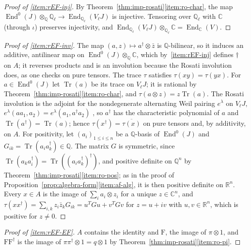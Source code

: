 \documentclass[11pt]{amsart}
\theoremstyle{plain}
\theoremstyle{definition}
\theoremstyle{remark}
\numberwithin{equation}{section}
\newcommand{\C}{\mathbb{C}}
\newcommand{\R}{\mathbb{R}}
\newcommand{\Q}{\mathbb{Q}}
\DeclareMathOperator{\Tr}{Tr}
\begin{document}
\begin{proof}[Proof of \ref{item:rEF-inj}]
By Theorem~\ref{thm:imp-rosati}\ref{item:ro-char}, the map
$\operatorname{End}^0(J)\otimes_\Q\Q_\ell\to\operatorname{End}_{\Q_\ell}
(V_\ell J)$ is injective. Tensoring over $\Q_\ell$ with $\C$ (through
$\iota$) preserves injectivity, and
$\operatorname{End}_{\Q_\ell}(V_\ell J)\otimes_{\Q_\ell}\C=
\operatorname{End}_\C(V)$.
\end{proof}

\begin{proof}[Proof of \ref{item:rEF-inv}]
The map $(a,z)\mapsto a^\dagger\otimes\bar z$ is $\Q$-bilinear, so it
induces an additive, antilinear map on
$\operatorname{End}^0(J)\otimes_\Q\C$, which by~\ref{item:rEF-inj}
defines $\dagger$ on $A$; it reverses products and is an involution
because the Rosati involution does, as one checks on pure tensors. The
trace $\tau$ satisfies $\tau(xy)=\tau(yx)$. For
$a\in\operatorname{End}^0(J)$ let $\Tr(a)$ be its trace on $V_\ell J$;
it is rational by Theorem~\ref{thm:imp-rosati}\ref{item:ro-char}, and
$\tau(a\otimes z)=z\Tr(a)$. The Rosati involution is the adjoint for
the nondegenerate alternating Weil pairing $e^\lambda$ on $V_\ell J$,
$e^\lambda(aa_1,a_2)=e^\lambda(a_1,a^\dagger a_2)$
\cite[\S14, p.~61]{MilneAV2008}, so $a^\dagger$ has the characteristic
polynomial of $a$ and $\Tr(a^\dagger)=\Tr(a)$; hence
$\tau(x^\dagger)=\overline{\tau(x)}$ on pure tensors and, by
additivity, on $A$. For positivity, let $(a_i)_{1\le i\le n}$ be a
$\Q$-basis of $\operatorname{End}^0(J)$ and $G_{ik}=\Tr(a_ia_k^\dagger)
\in\Q$. The matrix $G$ is symmetric, since
$\Tr(a_ka_i^\dagger)=\Tr((a_ia_k^\dagger)^\dagger)$, and positive
definite on $\Q^n$ by Theorem~\ref{thm:imp-rosati}\ref{item:ro-pos};
as in the proof of
Proposition~\ref{prop:algebra-form}\ref{item:af-alg}, it is then
positive definite on $\R^n$. Every $x\in A$ is the image of
$\sum_ia_i\otimes z_i$ for a unique $z\in\C^n$, and
$\tau(xx^\dagger)=\sum_{i,k}z_i\bar z_kG_{ik}=u^TGu+v^TGv$ for
$z=u+iv$ with $u,v\in\R^n$, which is positive for $z\ne0$.
\end{proof}

\begin{proof}[Proof of \ref{item:rEF-EF}]
$A$ contains the identity and $\mathrm{F}$, the image of
$\pi\otimes1$, and $\mathrm{F}\mathrm{F}^\dagger$ is the image of
$\pi\pi^\dagger\otimes1=q\otimes1$ by
Theorem~\ref{thm:imp-rosati}\ref{item:ro-pi}.
\end{proof}
\end{document}
